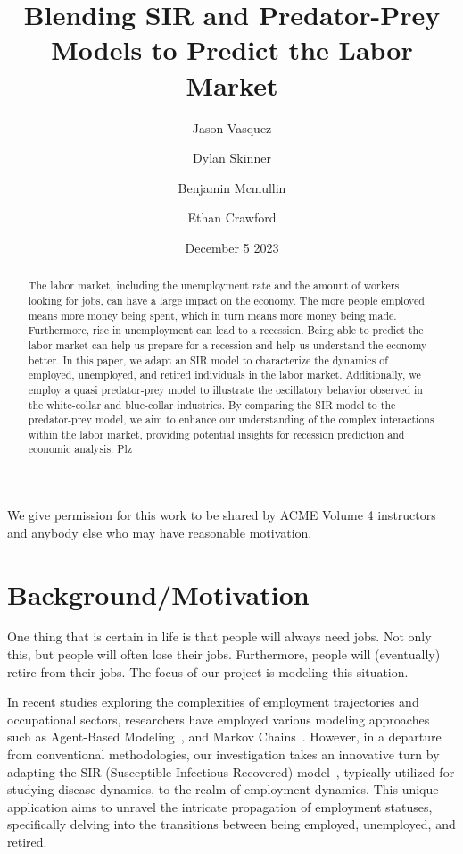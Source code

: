 \documentclass[11pt]{amsart}
\title{Blending SIR and Predator-Prey Models to Predict the Labor Market}
\author{Jason Vasquez \and Dylan Skinner \and Benjamin Mcmullin \and Ethan Crawford}
\date{December 5 2023}
\begin{document}
\begin{abstract}
    
    The labor market, including the unemployment rate and the amount of workers looking for jobs, can have a large impact on the economy.
    The more people employed means more money being spent, which in turn means more money being made. 
    Furthermore, rise in unemployment can lead to a recession. Being able to predict the labor market can help us prepare for a recession and help us understand the economy better.
    In this paper, we adapt an SIR model to characterize the dynamics of employed, unemployed, and retired individuals in the labor market. 
    Additionally, we employ a quasi predator-prey model to illustrate the oscillatory behavior observed in the white-collar and blue-collar industries. 
    By comparing the SIR model to the predator-prey model, we aim to enhance our understanding of the complex interactions within the labor market, 
    providing potential insights for recession prediction and economic analysis. Plz
    
\end{abstract}

\maketitle

We give permission for this work to be shared by ACME Volume 4 instructors and anybody else who may have reasonable motivation.

\section{Background/Motivation}

One thing that is certain in life is that people will always need jobs. Not only this, but people 
will often lose their jobs. Furthermore, people will (eventually) retire from their jobs.
The focus of our project is modeling this situation.

In recent studies exploring the complexities of employment trajectories and occupational sectors, researchers 
have employed various modeling approaches such as Agent-Based Modeling~\cite{neves2019innovation}, and Markov Chains~\cite{zais2016markov}. However, 
in a departure from conventional methodologies, our investigation takes an innovative turn by adapting 
the SIR (Susceptible-Infectious-Recovered) model~\cite{kermack1927contribution}, typically utilized for studying disease dynamics, to the 
realm of employment dynamics. This unique application aims to unravel the intricate propagation of employment 
statuses, specifically delving into the transitions between being employed, unemployed, and retired.
\end{document}
